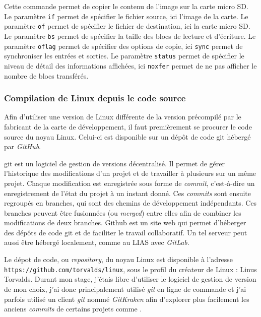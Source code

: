 Cette commande permet de copier le contenu de l'image sur la carte micro SD. Le paramètre \texttt{if} permet de spécifier le fichier source, ici l'image de la carte. Le paramètre \texttt{of} permet de spécifier le fichier de destination, ici la carte micro SD. Le paramètre \texttt{bs} permet de spécifier la taille des blocs de lecture et d'écriture. Le paramètre \texttt{oflag} permet de spécifier des options de copie, ici \texttt{sync} permet de synchroniser les entrées et sorties. Le paramètre \texttt{status} permet de spécifier le niveau de détail des informations affichées, ici \texttt{noxfer} permet de ne pas afficher le nombre de blocs transférés.

\subsubsection{Compilation de Linux depuis le code source}\label{sec:compilation-linux-source}

Afin d'utiliser une version de Linux différente de la version précompilé par le fabricant de la carte de développement, il faut premièrement se procurer le code source du noyau Linux. Celui-ci est disponible sur un dépôt de code \gls{git} hébergé par \textit{GitHub}. 

\gls{git} est un logiciel de gestion de versions décentralisé. Il permet de gérer l'historique des modifications d'un projet et de travailler à plusieurs sur un même projet. Chaque modification est enregistrée sous forme de \textit{commit}, c'est-à-dire un enregistrement de l'état du projet à un instant donné. Ces \textit{commits} sont ensuite regroupés en branches, qui sont des chemins de développement indépendants. Ces branches peuvent être fusionnées (ou \textit{merged}) entre elles afin de combiner les modifications de deux branches. Github est un site web qui permet d'héberger des dépôts de code \gls{git} et de faciliter le travail collaboratif. Un tel serveur peut aussi être hébergé localement, comme au LIAS avec \textit{GitLab}.

Le dépot de code, ou \textit{repository}, du noyau Linux est disponible à l'adresse \\ \texttt{https://github.com/torvalds/linux}, sous le profil du créateur de Linux : Linus Torvalds. Durant mon stage, j'étais libre d'utiliser le logiciel de gestion de version de mon choix, j'ai donc principalement utilisé \textit{git} en ligne de commande et j'ai parfois utilisé un client \textit{git} nommé \textit{GitKraken} afin d'explorer plus facilement les anciens \textit{commits} de certains projets comme \litmus.

